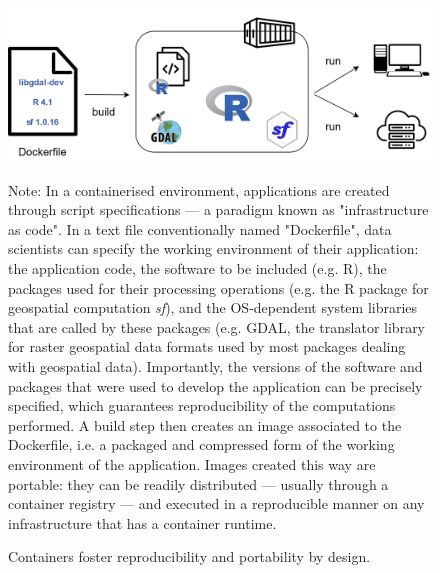 \documentclass[graybox]{svmult}
\begin{document}
\begin{figure}[htbp]
    \begin{center}
        \includegraphics[width=0.85\linewidth]{figures/containers-portability.png}
    \end{center}
    \caption{Containers foster reproducibility and portability by design.}
    \label{fig:containers-portability}
    \medskip
    {\footnotesize Note: In a containerised environment, applications are created through script specifications — a paradigm known as "infrastructure as code". In a text file conventionally named "Dockerfile", data scientists can specify the working environment of their application: the application code, the software to be included (e.g. R), the packages used for their processing operations (e.g. the R package for geospatial computation \textit{sf}), and the OS-dependent system libraries that are called by these packages (e.g. GDAL, the translator library for raster geospatial data formats used by most packages dealing with geospatial data). Importantly, the versions of the software and packages that were used to develop the application can be precisely specified, which guarantees reproducibility of the computations performed. A build step then creates an image associated to the Dockerfile, i.e. a packaged and compressed form of the working environment of the application. Images created this way are portable: they can be readily distributed — usually through a container registry — and executed in a reproducible manner on any infrastructure that has a container runtime. 
    }
\end{figure}
\end{document}
